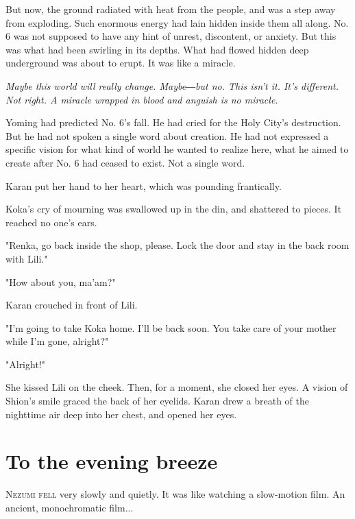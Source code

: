 But now, the ground radiated with heat from the people, and was a step
away from exploding. Such enormous energy had lain hidden inside them
all along. No. 6 was not supposed to have any hint of unrest,
discontent, or anxiety. But this was what had been swirling in its
depths. What had flowed hidden deep underground was about to erupt. It
was like a miracle.

\emph{Maybe this world will really change. Maybe―but no. This isn't it. It's
	different. Not right. A miracle wrapped in blood and anguish is no
	miracle.}

Yoming had predicted No. 6's fall. He had cried for the Holy City's
destruction. But he had not spoken a single word about creation. He had
not expressed a specific vision for what kind of world he wanted to
realize here, what he aimed to create after No. 6 had ceased to exist.
Not a single word.

Karan put her hand to her heart, which was pounding frantically.

Koka's cry of mourning was swallowed up in the din, and shattered to
pieces. It reached no one's ears.

"Renka, go back inside the shop, please. Lock the door and stay in the
back room with Lili."

"How about you, ma'am?"

Karan crouched in front of Lili.

"I'm going to take Koka home. I'll be back soon. You take care of your
mother while I'm gone, alright?"

"Alright!"

She kissed Lili on the cheek. Then, for a moment, she closed her eyes. A
vision of Shion's smile graced the back of her eyelids. Karan drew a
breath of the nighttime air deep into her chest, and opened her eyes.

\chapter{To the evening breeze}


\lettrine{N}{ezumi fell} very slowly and quietly. It was like watching a slow-motion
film. An ancient, monochromatic film...

